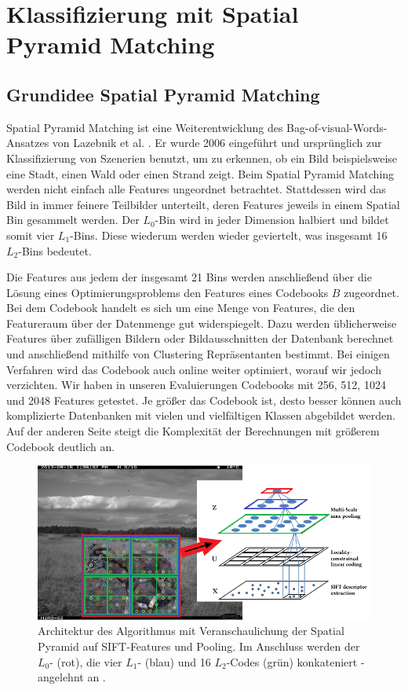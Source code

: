 \section{Klassifizierung mit Spatial Pyramid Matching}

\subsection{Grundidee Spatial Pyramid Matching}

Spatial Pyramid Matching ist eine Weiterentwicklung des Bag-of-visual-Words-Ansatzes von Lazebnik et al. \cite{lsp06}. Er wurde 2006 eingeführt und ursprünglich zur Klassifizierung von Szenerien benutzt, um zu erkennen, ob ein Bild beispielsweise eine Stadt, einen Wald oder einen Strand zeigt. Beim Spatial Pyramid Matching werden nicht einfach alle Features ungeordnet betrachtet. Stattdessen wird das Bild in immer feinere Teilbilder unterteilt, deren Features jeweils in einem Spatial Bin gesammelt werden. Der $L_0$-Bin wird in jeder Dimension halbiert und bildet somit vier $L_1$-Bins. Diese wiederum werden wieder geviertelt, was insgesamt 16 $L_2$-Bins bedeutet.

Die Features aus jedem der insgesamt 21 Bins werden anschließend über die Lösung eines Optimierungsproblems den Features eines Codebooks $B$ zugeordnet. Bei dem Codebook handelt es sich um eine Menge von Features, die den Featureraum über der Datenmenge gut widerspiegelt. Dazu werden üblicherweise Features über zufälligen Bildern oder Bildausschnitten der Datenbank berechnet und anschließend mithilfe von Clustering Repräsentanten bestimmt. Bei einigen Verfahren wird das Codebook auch online weiter optimiert, worauf wir jedoch verzichten. Wir haben in unseren Evaluierungen Codebooks mit 256, 512, 1024 und 2048 Features getestet. Je größer das Codebook ist, desto besser können auch komplizierte Datenbanken mit vielen und vielfältigen Klassen abgebildet werden. Auf der anderen Seite steigt die Komplexität der Berechnungen mit größerem Codebook deutlich an.

\begin{figure}
	\centering
	\includegraphics[scale=1]{img/sift_spm.png}
	\caption{Architektur des Algorithmus mit Veranschaulichung der Spatial Pyramid auf SIFT-Features und Pooling. Im Anschluss werden der $L_0$- (rot), die vier $L_1$- (blau) und 16 $L_2$-Codes (grün) konkateniert - angelehnt an \cite{yygh09}.}
	\label{img:architecture}
\end{figure}

